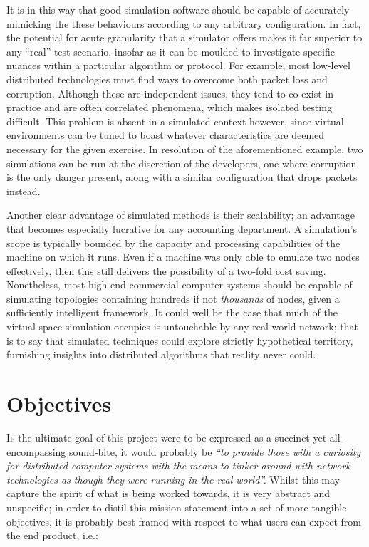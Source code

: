 It is in this way that good simulation software should be capable of accurately mimicking the these behaviours
according to any arbitrary configuration. In fact, the potential for acute granularity that a simulator offers makes
it far superior to any ``real'' test scenario, insofar as it can be moulded to investigate specific nuances within a
particular algorithm or protocol. For example, most low-level distributed technologies must find ways to overcome
both packet loss and corruption. Although these are independent issues, they tend to co-exist in practice and are
often correlated phenomena, which makes isolated testing difficult. This problem is absent in a simulated context
however, since virtual environments can be tuned to boast whatever characteristics are deemed necessary for
the given exercise. In resolution of the aforementioned example, two simulations can be run at the discretion of the
developers, one where corruption is the only danger present, along with a similar configuration that drops packets
instead.

Another clear advantage of simulated methods is their scalability; an advantage that becomes especially lucrative for
any accounting department. A simulation's scope is typically bounded by the capacity and processing capabilities of
the machine on which it runs. Even if a machine was only able to emulate two nodes effectively, then this still
delivers the possibility of a two-fold cost saving. Nonetheless, most high-end commercial computer systems should be
capable of simulating topologies containing hundreds if not \emph{thousands} of nodes, given a sufficiently
intelligent framework. It could well be the case that much of the virtual space simulation occupies is untouchable by
any real-world network; that is to say that simulated techniques could explore strictly hypothetical territory,
furnishing insights into distributed algorithms that reality never could.


\section{Objectives}\label{section:objectives}

\lettrine{I}{f} the ultimate goal of this project were to be expressed as a succinct yet all-encompassing sound-bite,
it would probably be \emph{``to provide those with a curiosity for distributed computer systems with the means to tinker
around with network technologies as though they were running in the real world''.} Whilst this may capture the
spirit of what is being worked towards, it is very abstract and unspecific; in order to distil this
mission statement into a set of more tangible objectives, it is probably best framed with respect to what users can
expect from the end product, i.e.:

